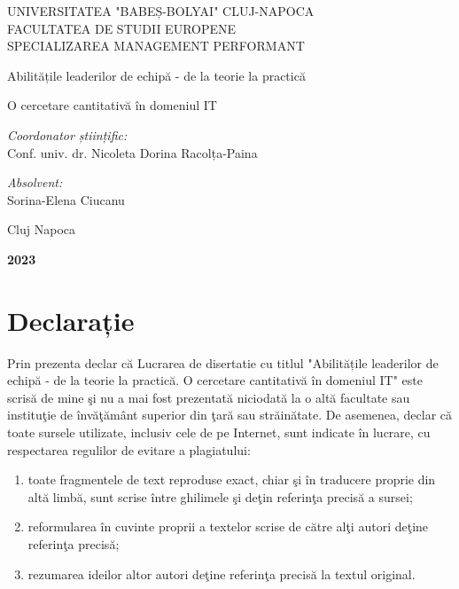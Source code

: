 \documentclass[a4paper, 12pt]{article}
\begin{document}
\begin{titlepage}
	\begin{center}
		\vspace{0.5cm}
		\large {UNIVERSITATEA "BABEȘ-BOLYAI" CLUJ-NAPOCA}
		\\
		\large {FACULTATEA DE STUDII EUROPENE}
		\\\large {SPECIALIZAREA MANAGEMENT PERFORMANT}
		
		\vspace{2.75cm}
		
	
		\huge Abilitățile leaderilor de echipă - de la teorie la practică
		
		\huge O cercetare cantitativă  în domeniul IT
		\vspace{1.5 cm}
		
		\vfill
	\end{center}
	
	\begin{flushleft}
		\large{\textit{Coordonator științific:}} \\
		\large{Conf. univ. dr. Nicoleta Dorina Racolța-Paina}
	\end{flushleft}
	
	\begin{flushright}
		\hfill \large {\textit{Absolvent:}} \\
		\hfill \large {Sorina-Elena Ciucanu}
	\end{flushright}
	
	\begin{center}
		\vspace{1.5cm}
		\Large{Cluj Napoca}
		
		\large \textbf{2023}
	\end{center}
\end{titlepage}
\restoregeometry
\thispagestyle{empty}
\section*{Declarație}
\bigskip
\qquad Prin prezenta declar că Lucrarea de disertatie cu titlul "Abilitățile leaderilor de echipă - de la teorie la practică. O cercetare cantitativă  în domeniul IT" este scrisă de mine şi nu a mai fost prezentată niciodată la o altă facultate sau instituţie de învăţământ superior din ţară sau străinătate. De asemenea, declar că toate sursele utilizate, inclusiv cele de pe Internet, sunt indicate în lucrare, cu respectarea regulilor de evitare a plagiatului:
	\begin{enumerate}[-]
	\item toate fragmentele de text reproduse exact, chiar şi în traducere proprie din altă limbă, sunt scrise între ghilimele şi deţin referinţa precisă a sursei;
	\item reformularea în cuvinte proprii a textelor scrise de către alţi autori deţine referinţa precisă;
	\item rezumarea ideilor altor autori deţine referinţa precisă la textul original.
	\end{enumerate}
\end{document}
